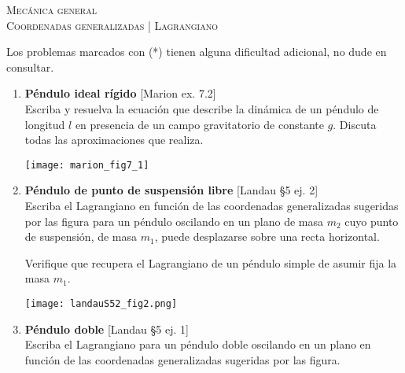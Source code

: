 \documentclass[11pt,spanish,a4paper]{article}
\begin{document}
\begin{center}
  \textsc{\large Mecánica general}\\
  \textsc{\large Coordenadas generalizadas | Lagrangiano}
\end{center}

\noindent
Los problemas marcados con (*) tienen alguna dificultad adicional, no dude en consultar.
\begin{enumerate}


\item \begin{minipage}[t][3.5cm]{0.7\textwidth}
\textbf{Péndulo ideal rígido} [Marion ex. 7.2]\\
Escriba y resuelva la ecuación que describe la dinámica de un péndulo de longitud $l$ en presencia de un campo gravitatorio de constante $g$. Discuta todas las aproximaciones que realiza.
\end{minipage}
\begin{minipage}[c][1cm][t]{0.3\textwidth}
	\texttt{[image: marion\_fig7\_1]}
\end{minipage}




\item \begin{minipage}[t][3.5cm]{0.7\textwidth}
\textbf{Péndulo de punto de suspensión libre} [Landau \S5 ej. 2]\\
Escriba el Lagrangiano en función de las coordenadas generalizadas sugeridas por las figura para un péndulo oscilando en un plano de masa \(m_2\) cuyo punto de suspensión, de masa \(m_1\), puede desplazarse sobre una recta horizontal.

Verifique que recupera el Lagrangiano de un péndulo simple de asumir fija la masa \(m_1\).
\end{minipage}
	\begin{minipage}[c][1cm][t]{0.3\textwidth}
        \texttt{[image: landauS52\_fig2.png]}
\end{minipage}




\item \begin{minipage}[t][4.5cm]{0.7\textwidth}
\textbf{Péndulo doble} [Landau \S5 ej. 1]\\
Escriba el Lagrangiano para un péndulo doble oscilando en un plano en función de las coordenadas generalizadas sugeridas por las figura.


\end{minipage}
\end{enumerate}
\end{document}
